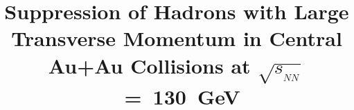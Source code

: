%
%
%
%
%


\draft

%

\title{Suppression of Hadrons with Large Transverse Momentum 
in Central Au+Au Collisions at $\sqrt{s_{_{NN}}}$~=~130~GeV }


%

